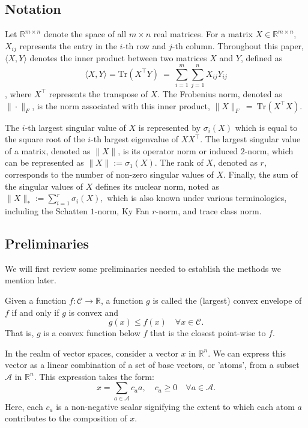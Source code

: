 \documentclass[10pt, twocolumn, reqno, a4paper,oneside]{amsart}
\numberwithin{equation}{section}
\numberwithin{theorem}{section}
\numberwithin{figure}{section}
\numberwithin{table}{section}
\numberwithin{theorem}{section}
\numberwithin{equation}{section}
\begin{document}
\subsection*{Notation}

Let $\mathbb{R}^{m \times n}$ denote the space of all $m \times n$ real matrices. For a matrix $X \in \mathbb{R}^{m \times n}$, $X_{ij}$ represents the entry in the $i$-th row and $j$-th column.
Throughout this paper, $\langle X, Y \rangle$ denotes the inner product between two matrices $X$ and $Y$, defined as
$$\langle X, Y \rangle = \text{Tr}(X^\top Y)~=~ \sum_{i=1}^m\sum_{j=1}^n X_{ij}Y_{ij}$$, where $X^\top$ represents the transpose of $X$.
The Frobenius norm, denoted as $\| \cdot \|_F$, is the norm associated with this inner product,
$\|X\|_F~=~\text{Tr}(X^\top X)$.

The $i$-th largest singular value of $X$ is represented by $\sigma_i(X)$ which is equal to the square root of the $i$-th largest eigenvalue of $XX^\top$. The largest singular value of a matrix, denoted as $\|X\|$, is its operator norm or induced $2$-norm, which can be represented as
$\|X\| := \sigma_1(X).$
The rank of $X$, denoted as $r$, corresponds to the number of non-zero singular values of $X$.
Finally, the sum of the singular values of \(X\) defines its nuclear norm, noted as
$\|X\|_* := \sum_{i=1}^r \sigma_i(X),$
which is also known under various terminologies, including the Schatten $1$-norm, Ky Fan $r$-norm, and trace class norm.

\subsection{Preliminaries}
We will first review some preliminaries needed to establish the methods we mention later.
\begin{definition}
	Given a function \( f : \mathcal{C} \rightarrow \mathbb{R} \), a function \( g \) is called the (largest) convex envelope of \( f \) if and only if \( g \) is convex and
	\[
	g(x) \leq f(x) \quad \forall x \in \mathcal{C}.
	\]
	That is, \( g \) is a convex function below \( f \) that is the closest point-wise to \( f \).
\end{definition}

In the realm of vector spaces, consider a vector $x$ in $\mathbb{R}^n$. We can express this vector as a linear combination of a set of base vectors, or 'atoms', from a subset $\mathcal{A}$ in $\mathbb{R}^n$. This expression takes the form:
\begin{equation*}
	x = \sum_{a \in \mathcal{A}} c_a a, \quad c_a \geq 0 \quad \forall a \in \mathcal{A}.
\end{equation*}
Here, each $c_a$ is a non-negative scalar signifying the extent to which each atom $a$ contributes to the composition of $x$.
\end{document}
